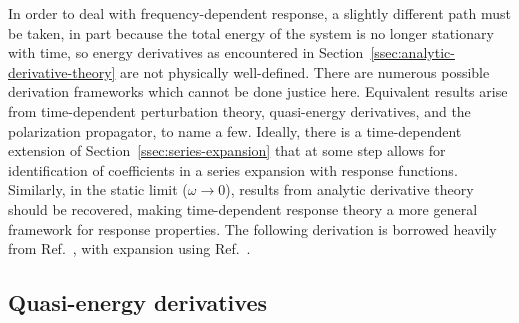\documentclass[%
class = book,%
crop = false,%
float = true,%
multi = true,%
preview = false,%
]{standalone}
\let\cite\autocite
\begin{document}
In order to deal with frequency-dependent response, a slightly different path must be taken, in part because the total energy of the system is no longer stationary with time, so energy derivatives as encountered in Section~\ref{ssec:analytic-derivative-theory} are not physically well-defined. There are numerous possible derivation frameworks which cannot be done justice here. Equivalent results arise from time-dependent perturbation theory, quasi-energy derivatives\cite{Christiansen1998,gauss2000,C1CP21951K,Toulouse2015}, and the polarization propagator\cite{mcweeny1989methods}, to name a few. Ideally, there is a time-dependent extension of Section~\ref{ssec:series-expansion} that at some step allows for identification of coefficients in a series expansion with response functions. Similarly, in the static limit (\(\omega \rightarrow 0\)), results from analytic derivative theory should be recovered, making time-dependent response theory a more general framework for response properties. The following derivation is borrowed heavily from Ref.~\parencite{Toulouse2015}, with expansion using Ref.~\parencite{gauss2000}.

\subsection{Quasi-energy derivatives}
\end{document}

